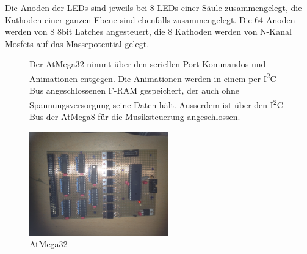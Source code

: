 \documentclass[11pt]{amsart}
\begin{document}
Die Anoden der LEDs sind jeweils bei 8 LEDs einer Säule zusammengelegt, die Kathoden einer ganzen Ebene sind ebenfalls zusammengelegt. Die 64 Anoden werden von 8 8bit Latches angesteuert, die 8 Kathoden werden von N-Kanal Mosfets auf das Massepotential gelegt.
\clearpage

\begin{figure}[hbp]
	\begin{minipage}[t]{7cm}
		\vspace{0pt}
		Der AtMega32 nimmt über den seriellen Port Kommandos und Animationen entgegen. Die Animationen werden in einem per I\textsuperscript{2}C-Bus angeschlossenen F-RAM gespeichert, der auch ohne Spannungsversorgung seine Daten hält. Ausserdem ist über den I\textsuperscript{2}C-Bus der AtMega8 für die Musiksteuerung angeschlossen.
	\end{minipage}
	\hfill
	\begin{minipage}[t]{6cm}
		\vspace{0pt}
		\centering
		\includegraphics[width=6cm]{platine1.jpg}
		\caption{AtMega32}
		\label{AtMega32}
	\end{minipage}
\end{figure}

\end{document}
